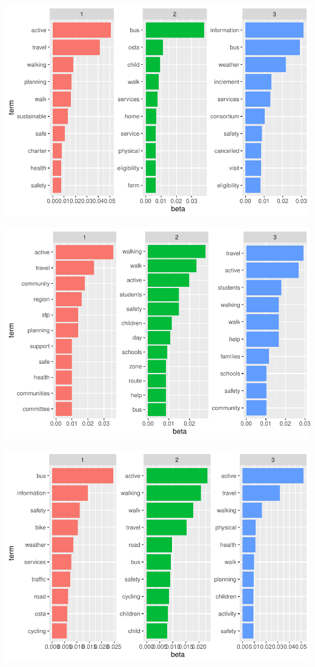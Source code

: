 \documentclass[]{elsarticle} %
\begin{document}
\includegraphics{AST-Framing-Ontario_files/figure-latex/school-terms-1.pdf}

\includegraphics{AST-Framing-Ontario_files/figure-latex/consortia-terms-1.pdf}

\includegraphics{AST-Framing-Ontario_files/figure-latex/policy-terms-1.pdf}
\end{document}
